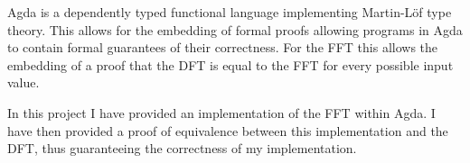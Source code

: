 \documentclass[12pt, twoside]{article}
\begin{document}
Agda is a dependently typed functional language implementing Martin-Löf type 
theory.
This allows for the embedding of formal proofs allowing programs in Agda to 
contain formal guarantees of their correctness.
For the FFT this allows the embedding of a proof that the DFT is equal to the FFT for
every possible input value.

In this project I have provided an implementation of the FFT within Agda.
I have then provided a proof of equivalence between this implementation and the 
DFT, thus guaranteeing the correctness of my implementation.




\clearpage

\clearpage
{}
\tableofcontents
\clearpage
\setlength{\parskip}{0.5em}
\clearpage







\clearpage


\end{document}
